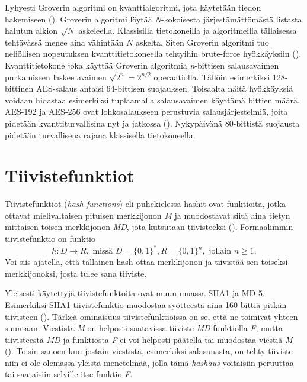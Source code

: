  Lyhyesti Groverin algoritmi on kvanttialgoritmi, jota käytetään tiedon hakemiseen (\cite{hayward2008quantum}). Groverin algoritmi löytää \emph{N}-kokoisesta järjestämättömästä listasta halutun alkion $\sqrt{N}$ askeleella. Klassisilla tietokoneilla ja algoritmeilla tällaisessa tehtävässä menee aina vähintään $N$ askelta. Siten Groverin algoritmi tuo neliöllisen nopeutuksen kvanttitietokoneella tehtyihin brute-force hyökkäyksiin (\cite{mavroeidis2018impact}). Kvanttitietokone joka käyttää Groverin algoritmia \emph{n}-bittisen salausavaimen purkamiseen laskee avaimen $\sqrt{2^{n}} = 2^{n/2}$ operaatiolla. Tällöin esimerkiksi 128-bittinen AES-salaus antaisi 64-bittisen suojauksen. Toisaalta näitä hyökkäyksiä voidaan hidastaa esimerkiksi tuplaamalla salausavaimen käyttämä bittien määrä. AES-192 ja AES-256 ovat lohkosalaukseen perustuvia salausjärjestelmiä, joita pidetään kvanttiturvallisina nyt ja jatkossa (\cite{mavroeidis2018impact}). Nykypäivänä 80-bittistä suojausta pidetään turvallisena rajana klassisella tietokoneella.
 
 \section{Tiivistefunktiot}
 Tiivistefunktiot (\emph{hash functions}) eli puhekielessä hashit  ovat funktioita, jotka ottavat mielivaltaisen pituisen merkkijonon \emph{M} ja muodostavat siitä aina tietyn mittaisen toisen merkkijonon \emph{MD}, jota kutsutaan tiivisteeksi (\cite{sobti2012cryptographic}). Formaalimmin tiivistefunktio on funktio
 \[h: D \to R, \text{ missä } D = \big\{0,1\big\}^{*}, R = \big\{0,1\big\}^{n}, \text{ jollain } n \geq 1.\] Voi siis ajatella, että tällainen hash ottaa merkkijonon ja tiivistää sen toiseksi merkkijonoksi, josta tulee sana tiiviste.
 
 Yleisesti käytettyjä tiivistefunktoita ovat muun muassa SHA1 ja MD-5. Esimerkiksi SHA1 tiivistefunktio muodostaa syötteestä aina 160 bittiä pitkän tiivisteen (\cite{bellare2005introduction}). Tärkeä ominaisuus tiivistefunktioissa on se, että ne toimivat yhteen suuntaan. Viestistä \emph{M} on helposti saatavissa tiiviste \emph{MD} funktiolla \emph{F}, mutta tiivisteestä \emph{MD} ja funktiosta \emph{F} ei voi helposti päätellä tai muodostaa viestiä \emph{M} (\cite{bakhtiari1995cryptographic}). Toisin sanoen kun jostain viestistä, esimerkiksi salasanasta, on tehty tiiviste niin ei ole olemassa yleistä menetelmää, jolla tämä \emph{hashaus} voitaisiin peruuttaa tai saataisiin selville itse funktio \emph{F}.
 
